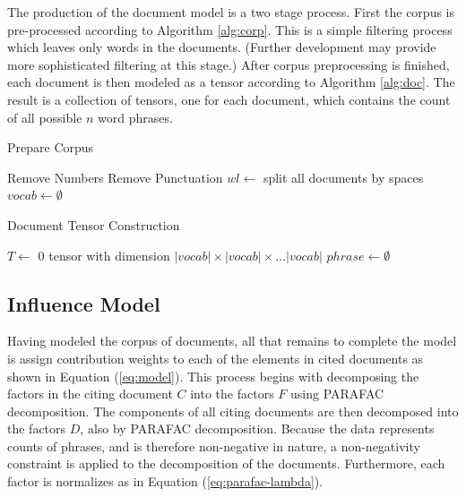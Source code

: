 \documentclass{article}
\begin{document}
The production of the document model is a two stage process.  First
the corpus is pre-processed according to Algorithm \ref{alg:corp}.
This is a simple filtering process which leaves only words in the
documents.  (Further development may provide more sophisticated
filtering at this stage.)  After corpus preprocessing is finished,
each document is then modeled as a tensor according to Algorithm
\ref{alg:doc}.  The result is a collection of tensors, one for each
document, which contains the count of all possible $n$ word phrases.

\begin{algorithm}
\caption{Prepare Corpus}
\label{alg:corp}
    Remove Numbers\;
    Remove Punctuation\;
    $wl \leftarrow $ split all documents by spaces\;
    $vocab \leftarrow \emptyset$\;
     {
    }
\end{algorithm}


\begin{algorithm}
\caption{Document Tensor Construction}
\label{alg:doc}
    $T \leftarrow$ 0 tensor with dimension $|vocab| \times |vocab| \times \ldots
    |vocab|$\;
    $phrase \leftarrow \emptyset$ \;
\end{algorithm}


\subsection{Influence Model}
Having modeled the corpus of documents, all that remains to complete
the model is assign contribution weights to each of the elements in
cited documents as shown in Equation (\ref{eq:model}).   This process
begins with decomposing the factors in the citing document $C$ into
the factors $F$ using PARAFAC decomposition.  The components of all
citing documents are then decomposed into the factors $D$, also by
PARAFAC decomposition. Because the data represents counts of phrases,
and is therefore non-negative in nature, a non-negativity constraint
is applied to the decomposition of the documents. Furthermore, each
factor is normalizes as in Equation (\ref{eq:parafac-lambda}).
\end{document}
